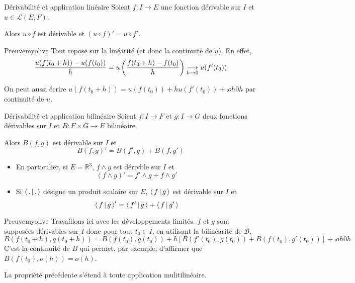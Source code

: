     \begin{prop}{Dérivabilité et application linéaire}{}
        Soient $f : I \to E$ une fonction dérivable sur $I$ et $u \in \mathcal{L}(E,F)$.

        Alors $u \circ f$ est dérivable et $\left(u \circ f\right)' = u \circ f'$.
    \end{prop}

    \begin{demo}{Preuve}{myolive}
        Tout repose sur la linéarité (et donc la continuité de $u$). En effet, 
        \[ \frac{u(f(t_0 + h)) - u(f(t_0))}{h} = u \left(\frac{f(t_0 + h) - f(t_0)}{h}\right) \underset{h \rightarrow 0}{\longrightarrow} u(f'(t_0)) \]

        On peut aussi écrire $u(f(t_0 + h)) = u(f(t_0)) + h u(f'(t_0)) + \comp{o}{h}{0}{h}$ par continuité de $u$.
    \end{demo}

    \begin{prop}{Dérivabilité et application bilinéaire}{}
        Soient $f : I \to F$ et $g : I \to G$ deux fonctions dérivables sur $I$ et $B : F \times G \to E$ bilinéaire.

        Alors $B(f,g)$ est dérivable sur $I$ et 
        \[ B(f,g)' = B(f',g) + B(f,g') \]
    \end{prop}

    \begin{itemize}
        \item En particulier, si $E = \mathbb{R}^3$, $f \wedge g$ est dérivble sur $I$ et 
        \[ \left(f \wedge g\right)' = f' \wedge g + f \wedge g' \]   
        \item Si $\left<\,.\,\middle|\,.\,\right>$ désigne un produit scalaire sur $E$, $\left<\,f\,\middle|\,g\,\right>$ est dérivable sur $I$ et 
        \[ \left<\,f\,\middle|\,g\,\right>' = \left<\,f'\,\middle|\,g\,\right> + \left<\,f\,\middle|\,g'\,\right> \]   
    \end{itemize}

    \begin{demo}{Preuve}{myolive}
        Travaillons ici avec les développements limités. $f$ et $g$ sont supposées dérivables sur $I$ donc pour tout $t_0 \in I$, en utilisant la bilinéarité de $\mathcal{B}$,
        \[ B\left(f(t_0 + h), g(t_0 + h)\right) = B\left(f(t_0),g(t_0)\right) + h \left[B\left( f'(t_0), g(t_0) \right) + B\left(f(t_0), g'(t_0)\right)\right] + \comp{o}{h}{0}{h} \]
        C’est la continuité de $B$ qui permet, par exemple, d’affirmer que $B(f(t_0), o(h)) = o(h)$.
    \end{demo}

    La propriété précédente s’étend à toute application mulitilinéaire.

